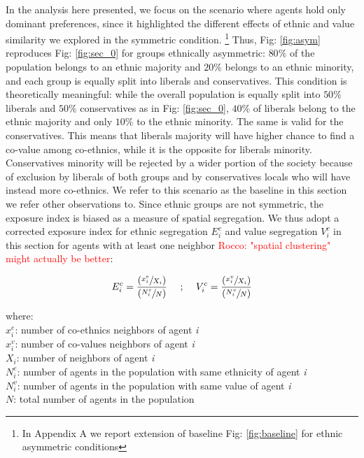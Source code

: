 \documentclass{article}
\newcommand{\rocco}[1]{{\textcolor{red}{Rocco: #1}}} %
\begin{document}
In the analysis here presented, we focus on the scenario where agents hold only dominant preferences, since it highlighted the different effects of ethnic and value similarity we explored in the symmetric condition. \footnote{In Appendix A we report extension of baseline Fig: \ref{fig:baseline} for ethnic asymmetric conditions} Thus, Fig: \ref{fig:asym} reproduces Fig: \ref{fig:sec_0} for groups ethnically asymmetric: $80 \%$ of the population belongs to an ethnic majority and $20 \%$ belongs to an ethnic minority, and each group is equally split into liberals and conservatives. This condition is theoretically meaningful: while the overall population is equally split into $50 \%$ liberals and $50 \%$ conservatives as in Fig: \ref{fig:sec_0}, $40 \%$ of liberals belong to the ethnic majority and only $10 \%$ to the ethnic minority.  The same is valid for the conservatives. This means that liberals majority will have higher chance to find a co-value among co-ethnics, while it is the opposite for liberals minority. Conservatives minority will be rejected by a wider portion of the society because of exclusion by liberals of both groups and by conservatives locals who will have instead more co-ethnics. We refer to this scenario as the baseline in this section we refer other observations to.
Since ethnic groups are not symmetric, the exposure index is biased as a measure of spatial segregation. We thus adopt a corrected exposure index for ethnic segregation $E^c_i$ and value segregation $V^c_i$ in this section for agents with at least one neighbor \rocco{"spatial clustering" might actually be better}:


\begin{equation}
    E^c_i = \frac{(\sfrac{x^e_i}{X_i})}{(\sfrac{N^e_i}{N})}  \quad\text{        ;          }\quad  V^c_i = \frac{(\sfrac{x^v_i}{X_i})}{(\sfrac{N^v_i}{N})} 
\end{equation}

where: \\
$x^e_i$: number of co-ethnics neighbors of agent \textit{i} \\
$x^v_i$: number of co-values neighbors of agent \textit{i} \\
$X_i$: number of neighbors of agent \textit{i} \\
$N^e_i$: number of agents in the population with same ethnicity of agent \textit{i} \\
$N^v_i$: number of agents in the population with same value of agent \textit{i} \\
$N$: total number of agents in the population \\
\end{document}
